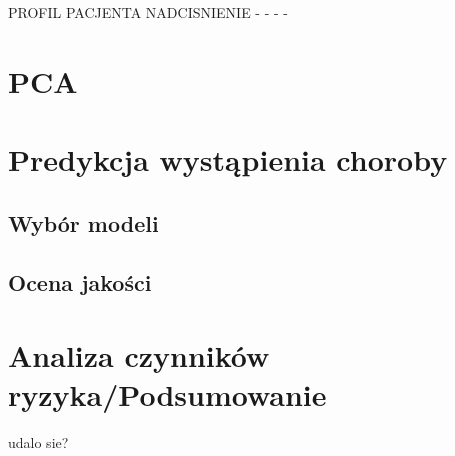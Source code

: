 \documentclass[onecolumn,12pt]{article}
\begin{document}
PROFIL PACJENTA NADCISNIENIE
-
-
- 
- 


\newpage

\section{PCA}
\section{Predykcja wystąpienia choroby}
\subsection{Wybór modeli}
\subsection{Ocena jakości}
\section{Analiza czynników ryzyka/Podsumowanie}
udalo sie? 

\begin{thebibliography}{9}
\end{thebibliography}
\end{document}
